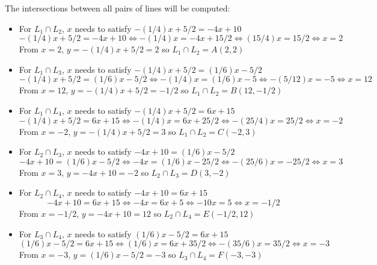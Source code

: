 \documentclass{article}
\begin{document}
The intersections between all pairs of lines will be computed:
\begin{itemize}
\item For \(L_1 \cap L_2\), \(x\) needs to satisfy \(-(1/4)x + 5/2 = -4x + 10\)
\[-(1/4)x + 5/2 = -4x + 10 \iff -(1/4)x = -4x + 15/2 \iff (15/4)x = 15/2 \iff x = 2\]
From \(x = 2\), \(y = -(1/4)x + 5/2 = 2\) so \(L_1 \cap L_2 = A(2, 2)\)
\item For \(L_1 \cap L_3\), \(x\) needs to satisfy \(-(1/4)x + 5/2 = (1/6)x - 5/2\)
\[-(1/4)x + 5/2 = (1/6)x - 5/2 \iff -(1/4)x = (1/6)x - 5 \iff -(5/12)x = -5 \iff x = 12\]
From \(x = 12\), \(y = -(1/4)x + 5/2 = -1/2\) so \(L_1 \cap L_2 = B(12, -1/2)\)
\item For \(L_1 \cap L_4\), \(x\) needs to satisfy \(-(1/4)x + 5/2 = 6x + 15\)
\[-(1/4)x + 5/2 = 6x + 15 \iff -(1/4)x = 6x + 25/2 \iff -(25/4)x = 25/2 \iff x = -2\]
From \(x = -2\), \(y = -(1/4)x + 5/2 = 3\) so \(L_1 \cap L_2 = C(-2, 3)\)
\item For \(L_2 \cap L_3\), \(x\) needs to satisfy \(-4x + 10 = (1/6)x - 5/2\)
\[-4x + 10 = (1/6)x - 5/2 \iff -4x = (1/6)x - 25/2 \iff -(25/6)x = -25/2 \iff x = 3\]
From \(x = 3\), \(y = -4x + 10 = -2\) so \(L_2 \cap L_3 = D(3, -2)\)
\item For \(L_2 \cap L_4\), \(x\) needs to satisfy \(-4x + 10 = 6x + 15\)
\[-4x + 10 = 6x + 15 \iff -4x = 6x + 5 \iff -10x = 5 \iff x = -1/2\]
From \(x = -1/2\), \(y = -4x + 10 = 12\) so \(L_2 \cap L_4 = E(-1/2, 12)\)
\item For \(L_3 \cap L_4\), \(x\) needs to satisfy \((1/6)x - 5/2 = 6x + 15\)
\[(1/6)x - 5/2 = 6x + 15 \iff (1/6)x = 6x + 35/2 \iff -(35/6)x = 35/2 \iff x = -3\]
From \(x = -3\), \(y = (1/6)x - 5/2 = -3\) so \(L_3 \cap L_4 = F(-3, -3)\)
\end{itemize}

\vspace{5mm}
\end{document}
